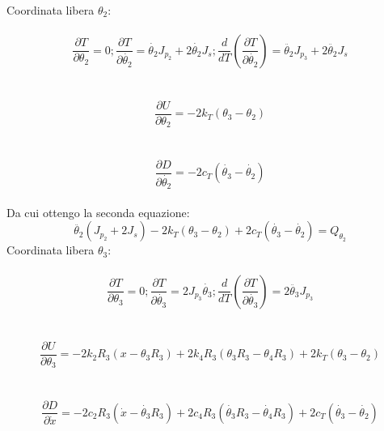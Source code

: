 \documentclass{article}
\begin{document}
\\
Coordinata libera $\theta_2$:
\\
\\
\begin{equation*}
\frac{ \partial T}{\partial \theta_2} = 0 ; \frac{\partial T}{\partial \dot{\theta_2}} = \dot{\theta_2}J_{p_2}+ 2\dot{\theta_2}J_{s};  \frac{d}{dT}(\frac{\partial T}{\partial \dot{\theta_2}})  = \ddot{\theta_2}J_{p_3}+2\ddot{\theta_2}J_{s}
\end{equation*}
\\
\\
\begin{equation*}
\frac{\partial U}{\partial \theta_2} = -2k_T(\theta_3-\theta_2) 
\end{equation*}
\\
\\
\begin{equation*}
\frac{\partial D}{\partial \dot{\theta_2}} =  -2c_T(\dot{\theta_3}-\dot{\theta_2})
\end{equation*}
\\
Da cui ottengo la seconda equazione: 
\\
\begin{equation*}
 \ddot{\theta_2}(J_{p_2} + 2 J_s) - 2k_{T}(\theta_{3} - \theta_{2}) + 2c_{T}(\dot{\theta_{3}} - \dot{\theta_{2}})= Q_{\theta_2}
\end{equation*}
Coordinata libera $\theta_3$:
\\
\\
\begin{equation*}
\frac{ \partial T}{\partial \theta_3} = 0 ; \frac{\partial T}{\partial \dot{\theta_3}} = 2J_{p_3}\dot{\theta_3};  \frac{d}{dT}(\frac{\partial T}{\partial \dot{\theta_3}})  = 2\ddot{\theta_3}J_{p_3}
\end{equation*}
\\
\\
\begin{equation*}
\frac{\partial U}{\partial \theta_3} = -2k_2R_3(x - \theta_3R_3) + 2k_4R_3(\theta_3 R_3 - \theta_4 R_3) + 2k_T(\theta_3 -  \theta_2)
\end{equation*}
\\
\\
\begin{equation*}
\frac{\partial D}{\partial \dot{x}} =  -2c_2R_3(\dot{x} - \dot{\theta_3}R_3) + 2c_4R_3(\dot{\theta_3} R_3 - \dot{\theta_4} R_3) +
2c_T(\dot{\theta_3} - \dot{ \theta_2})
\end{equation*}
\end{document}
